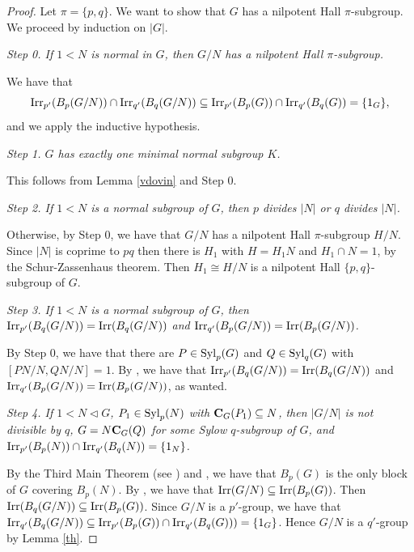 \documentclass[12pt,leqno,a4paper]{amsart}
\def\cent#1#2{{\bf C}_{#1}(#2)}
\theoremstyle{remark}
\begin{document}
\begin{proof}

Let $\pi=\{p,q\}$. We want to show that $G$ has a nilpotent Hall $\pi$-subgroup. We proceed by induction on $|G|$. 
\medskip

\textit{Step 0. If $1<N$ is normal in $G$, then $G/N$ has a nilpotent Hall $\pi$-subgroup.}
\smallskip

We have that $${\rm Irr}_{p'}(B_p(G/N))\cap{\rm Irr}_{q'}(B_q(G/N))\subseteq{\rm Irr}_{p'}(B_p(G))\cap {\rm Irr}_{q'}(B_q(G))=\{1_G\},$$
and we apply the inductive hypothesis.

\medskip

\textit{Step 1. $G$ has exactly
 one minimal normal subgroup $K$.}
 \smallskip
 
 This follows from Lemma \ref{vdovin} and Step 0.
 
 \medskip
 
\textit{Step 2. If $1<N$ is a normal subgroup of $G$, then $p$ divides $|N|$ or $q$ divides $|N|$.}
\smallskip

Otherwise, by Step 0, we have that $G/N$
has a nilpotent Hall $\pi$-subgroup $H/N$.  Since $|N|$ is coprime to $pq$ then there is $H_1$ with $H=H_1N$ and $H_1\cap N=1$,
by the Schur-Zassenhaus theorem.
 Then $H_1\cong H/N$ is a nilpotent Hall $\{p,q\}$-subgroup of $G$.
 
 \medskip
 
\textit{Step 3. If $1<N$ is
a normal subgroup of $G$,
then ${\rm Irr}_{p'}(B_q(G/N))={\rm Irr}(B_q(G/N))$ and  ${\rm Irr}_{q'}(B_p(G/N))={\rm Irr}(B_p(G/N))$.}
\smallskip

By Step 0,
we have that there are $P\in{\rm Syl}_{p}(G)$ and $Q\in{\rm Syl}_q(G)$ with $[PN/N,QN/N]=1$. By \cite[Theorem 4.1]{MN20},
 we have that ${\rm Irr}_{p'}(B_q(G/N))={\rm Irr}(B_q(G/N))$ and  ${\rm Irr}_{q'}(B_p(G/N))={\rm Irr}(B_p(G/N))$, as wanted.

\medskip

\textit{Step 4. If $1<N\lhd G$, $P_1\in{\rm Syl}_p(N)$ with $\cent G {P_1}\subseteq N$, 
then $|G/N|$ is not divisible by $q$, $G=N\cent GQ$ for some Sylow $q$-subgroup of $G$, and  ${\rm Irr}_{p'}(B_p(N))\cap{\rm Irr}_{q'}(B_q(N))=\{1_N\}$.}
\smallskip


By the Third Main Theorem (see \cite[Theorem 6.7]{nbook}) and \cite[Lemma 3.1]{NT12},
 we have that $B_p(G)$ is the only block of $G$ covering $B_p(N)$. By \cite[Theorem 9.2]{nbook},
 we have that ${\rm Irr}(G/N) \subseteq {\rm Irr}(B_p(G))$. Then ${\rm Irr}(B_q(G/N)) \subseteq {\rm Irr}(B_p(G))$.
Since $G/N$ is a $p'$-group, we have that  
${\rm Irr}_{q'}(B_q(G/N))\subseteq {\rm Irr}_{p'} (B_p(G))\cap{\rm Irr}_{q'}(B_q(G)))=\{1_G\}$.
Hence
$G/N$ is a $q'$-group by Lemma \ref{th}.


\end{proof}
\end{document}
